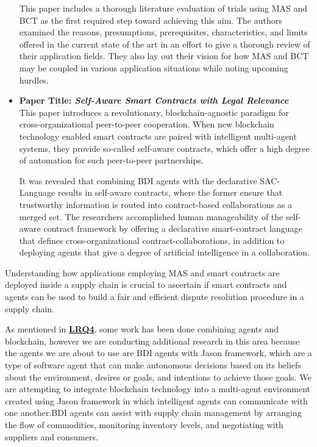 \begin{itemize}[label={}]
\vspace{.5cm}

This paper\cite{literature} includes a thorough literature evaluation of trials using \ac{MAS} and \ac{BCT} as the first required step toward achieving this aim. The authors examined the reasons, presumptions, prerequisites, characteristics, and limits offered in the current state of the art in an effort to give a thorough review of their application fields. They also lay out their vision for how \ac{MAS} and \ac{BCT} may be coupled in various application situations while noting upcoming hurdles.

\vspace{.5cm}

\item \textbf{Paper Title: \textit{Self-Aware Smart Contracts with Legal Relevance}} \\

This paper \cite{sac} introduces a revolutionary, blockchain-agnostic paradigm for cross-organizational peer-to-peer cooperation. When new blockchain technology enabled smart contracts are paired with intelligent multi-agent systems, they provide so-called self-aware contracts, which offer a high degree of automation for such peer-to-peer partnerships.

\vspace{.5cm}

It was revealed that combining \ac{BDI} agents with the declarative SAC-Language results in self-aware contracts, where the former ensure that trustworthy information is routed into contract-based collaborations as a merged set. The researchers accomplished human manageability of the self-aware contract framework by offering a declarative smart-contract language that defines cross-organizational contract-collaborations, in addition to deploying agents that give a degree of artificial intelligence in a collaboration.
\end{itemize}

\vspace{.5cm}

Understanding how applications employing \ac{MAS} and smart contracts are deployed inside a supply chain is crucial to ascertain if smart contracts and agents can be used to build a fair and efficient dispute resolution procedure in a supply chain. 

\vspace{.5cm}

As mentioned in \hyperref[LRQ4.]{\textbf{LRQ4}}, some work has been done combining agents and blockchain, however we are conducting additional research in this area because the agents we are about to use are \ac{BDI} agents with Jason framework, which are a type of software agent that can make autonomous decisions based on its beliefs about the environment, desires or goals, and intentions to achieve those goals. We are attempting to integrate blockchain technology into a multi-agent environment created using Jason framework in which intelligent agents can communicate with one another.\ac{BDI} agents can assist with supply chain management by arranging the flow of commodities, monitoring inventory levels, and negotiating with suppliers and consumers. 



